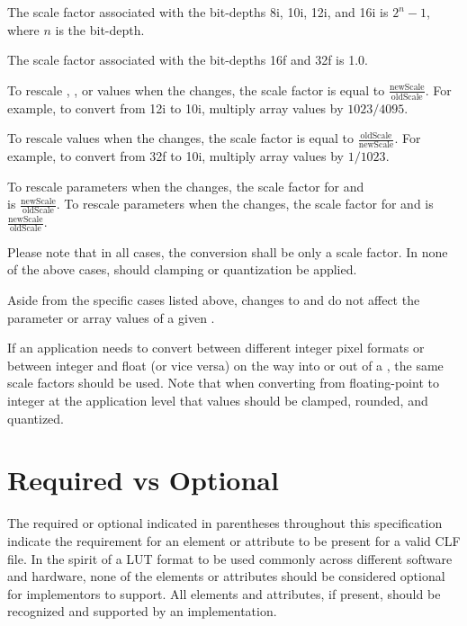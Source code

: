 The scale factor associated with the bit-depths 8i, 10i, 12i, and 16i is $2^n-1$, where $n$ is the bit-depth.

The scale factor associated with the bit-depths 16f and 32f is 1.0.

To rescale , , or   values when the  changes, the scale factor is equal to $\frac{\mathrm{newScale}}{\mathrm{oldScale}}$. For example, to convert from 12i to 10i, multiply array values by $1023/4095$.

To rescale   values when the  changes, the scale factor is equal to $\frac{\mathrm{oldScale}}{\mathrm{newScale}}$. For example, to convert from 32f to 10i, multiply array values by $1/1023$.

To rescale  parameters when the  changes, the scale factor for  and \\  is $\frac{\mathrm{newScale}}{\mathrm{oldScale}}$. To rescale  parameters when the  changes, the scale factor for  and  is $\frac{\mathrm{newScale}}{\mathrm{oldScale}}$.

Please note that in all cases, the conversion shall be only a scale factor. In none of the above cases, should clamping or quantization be applied.

Aside from the specific cases listed above, changes to  and  do not affect the parameter or array values of a given .

If an application needs to convert between different integer pixel formats or between integer and float (or vice versa) on the way into or out of a , the same scale factors should be used. Note that when converting from floating-point to integer at the application level that values should be clamped, rounded, and quantized.


\section{Required vs Optional}
The required or optional indicated in parentheses throughout this specification indicate the requirement for an element or attribute to be present for a valid CLF file. In the spirit of a LUT format to be used commonly across different software and hardware, none of the elements or attributes should be considered optional for implementors to support. All elements and attributes, if present, should be recognized and supported by an implementation.

